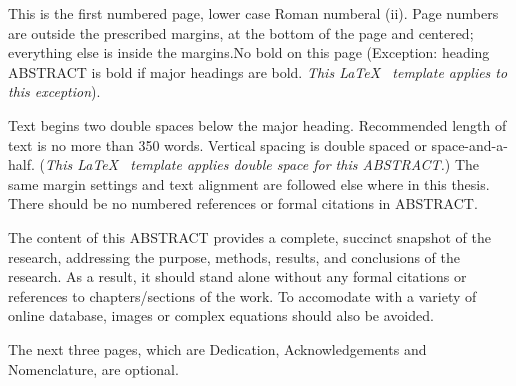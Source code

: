 \TAMUAbstractFormat


This is the first numbered page, lower case Roman numberal (ii). Page numbers are outside the prescribed margins, at the bottom of the page and centered; everything else is inside the margins.No bold on this page (Exception: heading ABSTRACT is bold if major headings are bold. \emph{This \LaTeX ~ template applies to this exception}).

Text begins two double spaces below the major heading. Recommended length of text is no more than 350 words. Vertical spacing is double spaced or space-and-a-half. (\emph{This \LaTeX ~ template applies double space for this ABSTRACT.}) The same margin settings and text alignment are followed else where in this thesis. There should be no numbered references or formal citations in ABSTRACT.

The content of this ABSTRACT provides a complete, succinct snapshot of the research, addressing the purpose, methods, results, and conclusions of the research. As a result, it should stand alone without any formal citations or references to chapters/sections of the work. To accomodate with a variety of online database, images or complex equations should also be avoided.

The next three pages, which are Dedication, Acknowledgements and Nomenclature, are optional.
